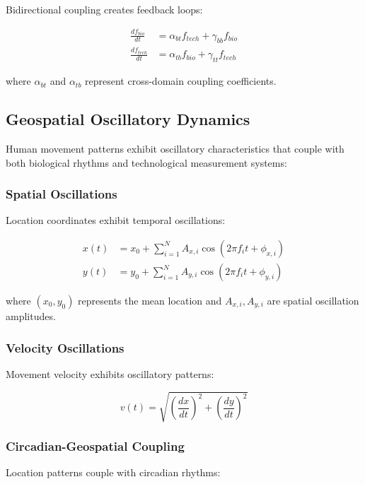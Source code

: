 \documentclass[12pt]{article}
\begin{document}
Bidirectional coupling creates feedback loops:

\begin{align}
\frac{df_{bio}}{dt} &= \alpha_{bt} f_{tech} + \gamma_{bb} f_{bio} \\
\frac{df_{tech}}{dt} &= \alpha_{tb} f_{bio} + \gamma_{tt} f_{tech}
\end{align}

where $\alpha_{bt}$ and $\alpha_{tb}$ represent cross-domain coupling coefficients.

\subsection{Geospatial Oscillatory Dynamics}

Human movement patterns exhibit oscillatory characteristics that couple with both biological rhythms and technological measurement systems:

\subsubsection{Spatial Oscillations}

Location coordinates exhibit temporal oscillations:

\begin{align}
x(t) &= x_0 + \sum_{i=1}^N A_{x,i} \cos(2\pi f_i t + \phi_{x,i}) \\
y(t) &= y_0 + \sum_{i=1}^N A_{y,i} \cos(2\pi f_i t + \phi_{y,i})
\end{align}

where $(x_0, y_0)$ represents the mean location and $A_{x,i}, A_{y,i}$ are spatial oscillation amplitudes.

\subsubsection{Velocity Oscillations}

Movement velocity exhibits oscillatory patterns:

\begin{equation}
v(t) = \sqrt{\left(\frac{dx}{dt}\right)^2 + \left(\frac{dy}{dt}\right)^2}
\end{equation}

\subsubsection{Circadian-Geospatial Coupling}

Location patterns couple with circadian rhythms:
\end{document}
